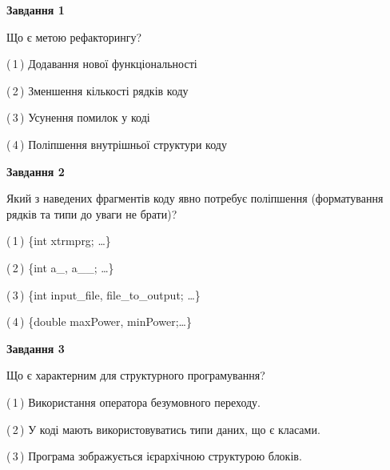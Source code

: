 \documentclass[10pt, ukrainian]{article}
\begin{document}
{
\begin {large}
{\begin {center}\textbf{Завдання 1}\end {center}}\par
Що є метою рефакторингу?\par
\vspace{2mm}



(\,1\,) Додавання нової функціональності%



(\,2\,) Зменшення кількості рядків коду%



(\,3\,) Усунення помилок у коді%



(\,4\,) Поліпшення внутрішньої структури коду%


{\begin {center}\textbf{Завдання 2}\end {center}}\par
Який з наведених фрагментів коду явно потребує поліпшення (форматування рядків та типи до уваги не брати)?\par
\vspace{2mm}



(\,1\,) \{int xtrmprg; …\}%



(\,2\,) \{int a\_, a\_\_; …\}%



(\,3\,) \{int input\_file, file\_to\_output; …\}%



(\,4\,) \{double maxPower, minPower;…\} %


{\begin {center}\textbf{Завдання 3}\end {center}}\par
Що є характерним для структурного програмування?\par
\vspace{2mm}



(\,1\,) Використання оператора безумовного переходу. %



(\,2\,) У коді мають використовуватись типи даних, що є класами. %



(\,3\,) Програма зображується ієрархічною структурою блоків.%




\end{large}}
\end{document}
